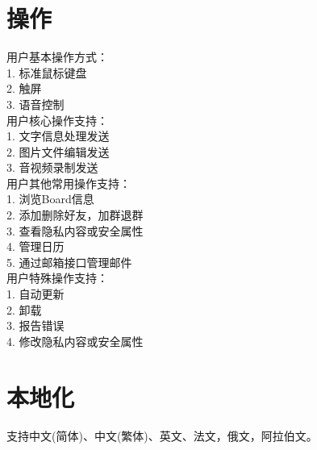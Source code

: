 \section{操作}
\noindent
用户基本操作方式：\\
    1. 标准鼠标键盘\\
    2. 触屏\\
    3. 语音控制\\
用户核心操作支持：\\
    1. 文字信息处理发送\\
    2. 图片文件编辑发送\\
    3. 音视频录制发送\\
用户其他常用操作支持：  \\
    1. 浏览Board信息\\
    2. 添加删除好友，加群退群\\
    3. 查看隐私内容或安全属性\\
    4. 管理日历\\
    5. 通过邮箱接口管理邮件\\
用户特殊操作支持：\\
    1. 自动更新\\
    2. 卸载\\
    3. 报告错误\\
    4. 修改隐私内容或安全属性
\section{本地化}
支持中文(简体)、中文(繁体)、英文、法文，俄文，阿拉伯文。